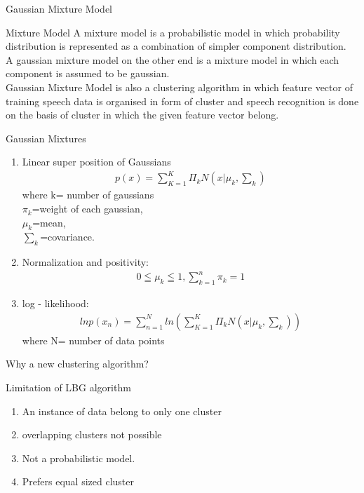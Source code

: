 \documentclass{beamer}
\begin{document}
\begin{frame}{Gaussian Mixture Model}

\begin{block}{Mixture Model}
A mixture model is a probabilistic model in which probability distribution is represented as a combination of simpler component distribution.\\
A gaussian mixture model on the other end is a mixture model in which each component is assumed to be gaussian.\\
Gaussian Mixture Model is also a clustering algorithm in which feature vector of training speech data is organised in form of cluster and speech recognition is done on the basis of cluster in which the given feature vector belong.


\end{block}
\end{frame}
\begin{frame}{Gaussian Mixtures}
\begin{enumerate}
    \item Linear super position of Gaussians
    \begin{align}
        p(x)= \sum_{K=1}^{K}\Pi_{k}N\left(x| \mu_{k},\sum_{k}\right)
        \end{align}
        where k= number of gaussians\\ $\pi_{k}$=weight of each gaussian,\\ $\mu_{k}$=mean,\\ $\sum_{k}$=covariance.
        
        
        \item Normalization and positivity:
        \begin{align}
            0 \leqq \mu_{k} \leqq 1, \sum_{k=1}^{n}\pi_{k}=1
        \end{align}
        \item log - likelihood:
        \begin{align}
            ln p(x_{n})=\sum_{n=1}^{N}ln\left(\sum_{K=1}^{K}\Pi_{k}N\left(x| \mu_{k},\sum_{k}\right)\right)
        \end{align}
        where N= number of data points
  
\end{enumerate}
\end{frame}
\begin{frame}{Why a new clustering algorithm?}
 \begin{block}{Limitation of LBG algorithm}
 \begin{enumerate}
     \item An instance of data belong to only one cluster
     \item overlapping clusters not possible
     \item Not a probabilistic model.
     \item Prefers equal sized cluster
 \end{enumerate}
 \end{block}
\end{frame}
\end{document}
